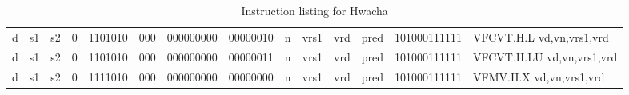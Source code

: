\begin{landscape}
\begin{table}[p]
\begin{small}
\begin{center}
\begin{tabular}{p{0.08in}@{}p{0.08in}@{}p{0.08in}@{}p{0.08in}@{}p{0.50in}@{}p{0.30in}@{}p{0.08in}@{}p{0.8in}@{}p{0.48in}@{}p{0.32in}@{}p{0.08in}@{}p{0.8in}@{}p{0.8in}@{}p{0.4in}@{}p{0.56in}l}
\multicolumn{1}{|c|}{d} &
\multicolumn{1}{c|}{s1} &
\multicolumn{1}{c|}{s2} &
\multicolumn{1}{c|}{0} &
\multicolumn{1}{c|}{1101010} &
\multicolumn{1}{c|}{000} &
\multicolumn{2}{c|}{000000000} &
\multicolumn{2}{c|}{00000010} &
\multicolumn{1}{c|}{n} &
\multicolumn{1}{c|}{vrs1} &
\multicolumn{1}{c|}{vrd} &
\multicolumn{1}{c|}{pred} &
\multicolumn{1}{c|}{101000111111} & VFCVT.H.L vd,vn,vrs1,vrd \\
\cline{1-15}
  

\multicolumn{1}{|c|}{d} &
\multicolumn{1}{c|}{s1} &
\multicolumn{1}{c|}{s2} &
\multicolumn{1}{c|}{0} &
\multicolumn{1}{c|}{1101010} &
\multicolumn{1}{c|}{000} &
\multicolumn{2}{c|}{000000000} &
\multicolumn{2}{c|}{00000011} &
\multicolumn{1}{c|}{n} &
\multicolumn{1}{c|}{vrs1} &
\multicolumn{1}{c|}{vrd} &
\multicolumn{1}{c|}{pred} &
\multicolumn{1}{c|}{101000111111} & VFCVT.H.LU vd,vn,vrs1,vrd \\
\cline{1-15}
  

\multicolumn{1}{|c|}{d} &
\multicolumn{1}{c|}{s1} &
\multicolumn{1}{c|}{s2} &
\multicolumn{1}{c|}{0} &
\multicolumn{1}{c|}{1111010} &
\multicolumn{1}{c|}{000} &
\multicolumn{2}{c|}{000000000} &
\multicolumn{2}{c|}{00000000} &
\multicolumn{1}{c|}{n} &
\multicolumn{1}{c|}{vrs1} &
\multicolumn{1}{c|}{vrd} &
\multicolumn{1}{c|}{pred} &
\multicolumn{1}{c|}{101000111111} & VFMV.H.X vd,vn,vrs1,vrd \\
\cline{1-15}
  

\end{tabular}
\end{center}
\end{small}
\caption{Instruction listing for Hwacha}
\label{instr-table}
\end{table}
\end{landscape}
\restoregeometry
  
